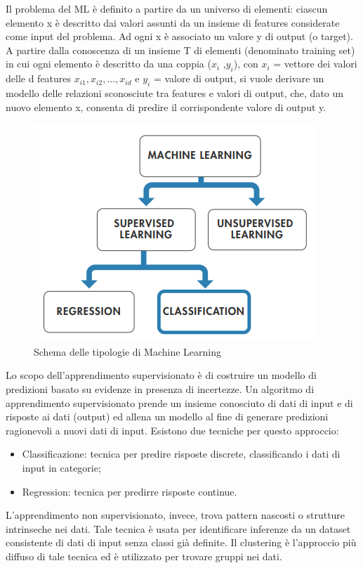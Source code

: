 Il problema del ML è definito a partire da un universo di elementi: ciascun elemento x è descritto dai valori assunti da un insieme di features considerate come input del problema. Ad ogni x è associato un valore y di output (o target). A partire dalla conoscenza di un insieme T di elementi (denominato training set) in cui ogni elemento è descritto da una coppia ($x_i$ ,$y_i$), con $x_i$ = vettore dei valori delle d features $x_{i1}, x_{i2}, ... , x_{id}$ e $y_i$ = valore di output, si vuole derivare un modello delle relazioni sconosciute tra features e valori di output, che, dato un nuovo elemento x, consenta di predire il corrispondente valore di output y. 
\begin{figure}[]
	\centering
	\includegraphics[scale=0.8]{images/Tipologie_Machine_Learning.png}
	\caption{Schema delle tipologie di Machine Learning}
\end{figure}
Lo scopo dell'apprendimento supervisionato è di costruire un modello di predizioni basato su evidenze in presenza di incertezze. Un algoritmo di apprendimento supervisionato prende un insieme conosciuto di dati di input e di risposte ai dati (output) ed allena un modello al fine di generare predizioni ragionevoli a nuovi dati di input. Esistono due tecniche per questo approccio:
\begin{itemize}
	\item Classificazione: tecnica per predire risposte discrete, classificando i dati di input in categorie;
	\item Regression: tecnica per predirre risposte continue.
\end{itemize}
L'apprendimento non supervisionato, invece, trova pattern nascosti o strutture intrinseche nei dati. Tale tecnica è usata per identificare inferenze da un dataset consistente di dati di input senza classi già definite. Il clustering è l'approccio più diffuso di tale tecnica ed è utilizzato per trovare gruppi nei dati.\\
